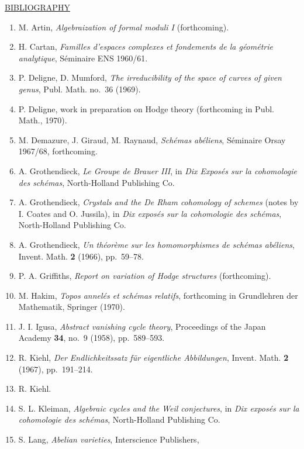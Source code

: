 \bigskip
\noindent\underline{BIBLIOGRAPHY}

\begin{enumerate}
\item[{[1]}] M. Artin, \emph{Algebraization of formal moduli I}
  (forthcoming).
\item[{[2]}] H. Cartan, \emph{Familles d'espaces complexes et fondements
  de la g\'{e}om\'{e}trie analytique}, S\'{e}minaire ENS 1960/61.
\item[{[3]}] P. Deligne, D. Mumford, \emph{The irreducibility of the space
  of curves of given genus}, Publ. Math. no.~36 (1969).
\item[{[4]}] P. Deligne, work in preparation on Hodge theory (forthcoming
  in Publ. Math., 1970).
\item[{[5]}] M. Demazure, J. Giraud, M. Raynaud, \emph{Sch\'{e}mas
  ab\'{e}liens}, S\'{e}minaire Orsay 1967/68, forthcoming.
\item[{[6]}] A. Grothendieck, \emph{Le Groupe de Brauer III}, in
  \emph{Dix Expos\'{e}s sur la cohomologie des sch\'{e}mas}, North-Holland
  Publishing Co.
\item[{[7]}] A. Grothendieck, \emph{Crystals and the De Rham cohomology of
  schemes} (notes by I. Coates and O. Jussila), in \emph{Dix expos\'{e}s
  sur la cohomologie des sch\'{e}mas}, North-Holland Publishing Co.
\item[{[8]}] A. Grothendieck, \emph{Un th\'{e}or\`{e}me sur les
  homomorphismes de sch\'{e}mas ab\'{e}liens}, Invent. Math. \textbf{2}
  (1966), pp.~59--78.
\item[{[9]}] P. A. Griffiths, \emph{Report on variation of Hodge
  structures} (forthcoming).
\item[{[10]}] M. Hakim, \emph{Topos annel\'{e}s et sch\'{e}mas relatifs},
  forthcoming in Grundlehren der Mathematik, Springer (1970).
\item[{[11]}] J. I. Igusa, \emph{Abstract vanishing cycle theory},
  Proceedings of the Japan Academy \textbf{34}, no.~9 (1958),
  pp.~589--593.
\item[{[12]}] R. Kiehl, \emph{Der Endlichkeitssatz f\"{u}r eigentliche
  Abbildungen}, Invent. Math. \textbf{2} (1967), pp.~191--214.
\item[{[13]}] R. Kiehl.
\item[{[14]}] S. L. Kleiman, \emph{Algebraic cycles and the Weil
  conjectures}, in \emph{Dix expos\'{e}s sur la cohomologie des sch\'{e}mas},
  North-Holland Publishing Co.
\item[{[15]}] S. Lang, \emph{Abelian varieties}, Interscience Publishers,

\end{enumerate}
